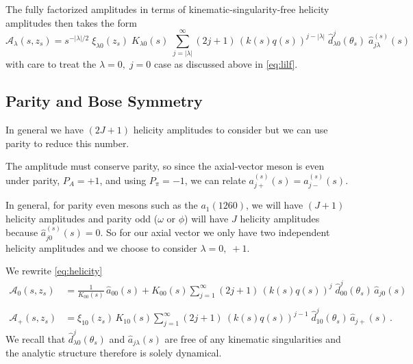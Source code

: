 \documentclass[10pt, aps,prd,amsmath,amssymb,superscriptaddress,onecolumn,
nofootinbib,showpacs,preprintnumbers]{revtex4-1}
\begin{document}
The fully factorized amplitudes in terms of kinematic-singularity-free helicity amplitudes then takes the form
  \begin{equation}
    \label{eq:helicity-final}
    \mathcal{A}_\lambda(s,z_s) = s^{-|\lambda|/2} \; \xi_{\lambda0}(z_s) \; K_{\lambda0}(s) \;  \sum_{j= |\lambda|}^\infty (2j+1) \, (k(s)q(s))^{j- |\lambda|} \; \hat{d}^j_{\lambda0}(\theta_s)  \; \hat{a}^{(s)}_{j\lambda}(s)
  \end{equation}
with care to treat the \(\lambda =0, \;  j=0\) case as discussed above in \cref{eq:lilf}.
\subsection{Parity and Bose Symmetry}
In general we have \((2J+1)\) helicity amplitudes to consider but we can use parity to reduce this number.

The amplitude must conserve parity, so since the axial-vector meson is even under parity, \( P_A = +1\), and using \(P_\pi = -1\), we can relate \(a_{j+}^{(s)}(s) = a_{j-}^{(s)}(s)\).

In general, for parity even mesons such as the \(a_1(1260)\), we will have \((J +1)\) helicity amplitudes and parity odd (\(\omega \text{ or } \phi\)) will have \(J\) helicity amplitudes because \(\hat{a}^{(s)}_{j0}(s) = 0\). So for our axial vector we only have two independent helicity amplitudes and we choose to consider \(\lambda = 0,\; +1\).

We rewrite \cref{eq:helicity}
  \begin{align}
    \label{eq:model-helicity-zero}
    \mathcal{A}_0(s,z_s) &= \frac{1}{K_{00}(s)} \, \hat{a}_{00}(s) + K_{00}(s) \sum_{j = 1}^\infty (2j+1) \, (k(s)q(s))^j \; \hat{d}_{00}^j(\theta_s) \, \hat{a}_{j0}(s) \\
    \nonumber \\
    \label{eq:model-helicity-plus}
    \mathcal{A}_+(s,z_s) &= \xi_{10}(z_s) \, K_{10}(s) \sum_{j = 1}^\infty (2j+1) \ (k(s)q(s))^{j-1} \;  \hat{d}_{10}^j(\theta_s) \, \hat{a}_{j+}(s) \,.
   \end{align}
We recall that \(\hat{d}^j_{\lambda 0}(\theta_s)\) and \(\hat{a}_{j\lambda}(s)\) are free of any kinematic singularities and the analytic structure therefore is solely dynamical.
\end{document}
